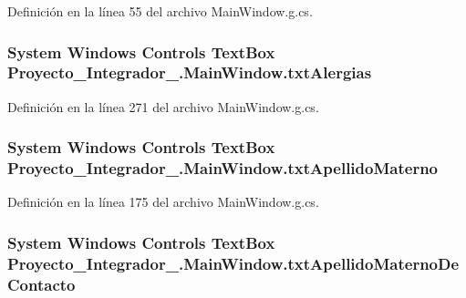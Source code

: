 Definición en la línea 55 del archivo Main\-Window.\-g.\-cs.

\hypertarget{class_proyecto___integrador__3_1_1_main_window_a4aae2b3a933df894d92ec27f865332e9}{
\subsubsection[{txt\-Alergias}]{\setlength{\rightskip}{0pt plus 5cm}System Windows Controls Text\-Box Proyecto\-\_\-\-Integrador\-\_.\-Main\-Window.\-txt\-Alergias\hspace{0.3cm}{\ttfamily [package]}}}\label{class_proyecto___integrador__3_1_1_main_window_a4aae2b3a933df894d92ec27f865332e9}


Definición en la línea 271 del archivo Main\-Window.\-g.\-cs.

\hypertarget{class_proyecto___integrador__3_1_1_main_window_ad6d2f2927d00f63954e85d4609c9c2b6}{
\subsubsection[{txt\-Apellido\-Materno}]{\setlength{\rightskip}{0pt plus 5cm}System Windows Controls Text\-Box Proyecto\-\_\-\-Integrador\-\_.\-Main\-Window.\-txt\-Apellido\-Materno\hspace{0.3cm}{\ttfamily [package]}}}\label{class_proyecto___integrador__3_1_1_main_window_ad6d2f2927d00f63954e85d4609c9c2b6}


Definición en la línea 175 del archivo Main\-Window.\-g.\-cs.

\hypertarget{class_proyecto___integrador__3_1_1_main_window_a3fc9dd11451712b3345df9f7a471d9b7}{
\subsubsection[{txt\-Apellido\-Materno\-De\-Contacto}]{\setlength{\rightskip}{0pt plus 5cm}System Windows Controls Text\-Box Proyecto\-\_\-\-Integrador\-\_.\-Main\-Window.\-txt\-Apellido\-Materno\-De\-Contacto\hspace{0.3cm}{\ttfamily [package]}}}\label{class_proyecto___integrador__3_1_1_main_window_a3fc9dd11451712b3345df9f7a471d9b7}


